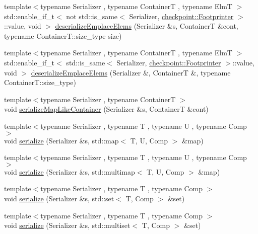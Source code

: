 \begin{DoxyCompactItemize}
\item 
{\footnotesize template$<$typename Serializer , typename ContainerT , typename ElmT $>$ }\\std\+::enable\+\_\+if\+\_\+t$<$ not std\+::is\+\_\+same$<$ Serializer, \hyperlink{structcheckpoint_1_1_footprinter}{checkpoint\+::\+Footprinter} $>$\+::value, void $>$ \hyperlink{namespacecheckpoint_a9016e0756f91e6e982b3c824c007c251}{deserialize\+Emplace\+Elems} (Serializer \&s, ContainerT \&cont, typename Container\+T\+::size\+\_\+type size)
\item 
{\footnotesize template$<$typename Serializer , typename ContainerT , typename ElmT $>$ }\\std\+::enable\+\_\+if\+\_\+t$<$ std\+::is\+\_\+same$<$ Serializer, \hyperlink{structcheckpoint_1_1_footprinter}{checkpoint\+::\+Footprinter} $>$\+::value, void $>$ \hyperlink{namespacecheckpoint_ac1dd08a1833499b9b6a302934c0b4603}{deserialize\+Emplace\+Elems} (Serializer \&, ContainerT \&, typename Container\+T\+::size\+\_\+type)
\item 
{\footnotesize template$<$typename Serializer , typename ContainerT $>$ }\\void \hyperlink{namespacecheckpoint_a99092baac18b33d03b1bb47ed1f2d7fa}{serialize\+Map\+Like\+Container} (Serializer \&s, ContainerT \&cont)
\item 
{\footnotesize template$<$typename Serializer , typename T , typename U , typename Comp $>$ }\\void \hyperlink{namespacecheckpoint_a39ee0888319dc204dff7af20dd1e8238}{serialize} (Serializer \&s, std\+::map$<$ T, U, Comp $>$ \&map)
\item 
{\footnotesize template$<$typename Serializer , typename T , typename U , typename Comp $>$ }\\void \hyperlink{namespacecheckpoint_a44434f578fc304afa3a62a9305be2a65}{serialize} (Serializer \&s, std\+::multimap$<$ T, U, Comp $>$ \&map)
\item 
{\footnotesize template$<$typename Serializer , typename T , typename Comp $>$ }\\void \hyperlink{namespacecheckpoint_a9f1869781f4cce4db94c144174680b24}{serialize} (Serializer \&s, std\+::set$<$ T, Comp $>$ \&set)
\item 
{\footnotesize template$<$typename Serializer , typename T , typename Comp $>$ }\\void \hyperlink{namespacecheckpoint_ae032265314cdf8e9155a6bbc423ca1c9}{serialize} (Serializer \&s, std\+::multiset$<$ T, Comp $>$ \&set)
\item 

\end{DoxyCompactItemize}
